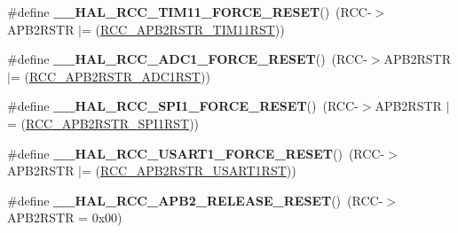 \begin{DoxyCompactItemize}
\item 
\hypertarget{group___r_c_c___a_p_b2___force___release___reset_gaeaf6b459cfeb85e2e098b78825e476f2}{\#define {\bfseries \-\_\-\-\_\-\-H\-A\-L\-\_\-\-R\-C\-C\-\_\-\-T\-I\-M11\-\_\-\-F\-O\-R\-C\-E\-\_\-\-R\-E\-S\-E\-T}()~(R\-C\-C-\/$>$A\-P\-B2\-R\-S\-T\-R $\vert$= (\hyperlink{group___peripheral___registers___bits___definition_ga9651c8201d42ba03bb1bf89d9d39e60c}{R\-C\-C\-\_\-\-A\-P\-B2\-R\-S\-T\-R\-\_\-\-T\-I\-M11\-R\-S\-T}))}\label{group___r_c_c___a_p_b2___force___release___reset_gaeaf6b459cfeb85e2e098b78825e476f2}

\item 
\hypertarget{group___r_c_c___a_p_b2___force___release___reset_ga6176fa4f52de6ebf932d99a4d611634d}{\#define {\bfseries \-\_\-\-\_\-\-H\-A\-L\-\_\-\-R\-C\-C\-\_\-\-A\-D\-C1\-\_\-\-F\-O\-R\-C\-E\-\_\-\-R\-E\-S\-E\-T}()~(R\-C\-C-\/$>$A\-P\-B2\-R\-S\-T\-R $\vert$= (\hyperlink{group___peripheral___registers___bits___definition_ga7b818d0d9747621c936ad16c93a4956a}{R\-C\-C\-\_\-\-A\-P\-B2\-R\-S\-T\-R\-\_\-\-A\-D\-C1\-R\-S\-T}))}\label{group___r_c_c___a_p_b2___force___release___reset_ga6176fa4f52de6ebf932d99a4d611634d}

\item 
\hypertarget{group___r_c_c___a_p_b2___force___release___reset_ga87e6bc588fa1d5ce3928d2fd2a3156a4}{\#define {\bfseries \-\_\-\-\_\-\-H\-A\-L\-\_\-\-R\-C\-C\-\_\-\-S\-P\-I1\-\_\-\-F\-O\-R\-C\-E\-\_\-\-R\-E\-S\-E\-T}()~(R\-C\-C-\/$>$A\-P\-B2\-R\-S\-T\-R $\vert$= (\hyperlink{group___peripheral___registers___bits___definition_ga345f05d3508a9fd5128208761feb29fb}{R\-C\-C\-\_\-\-A\-P\-B2\-R\-S\-T\-R\-\_\-\-S\-P\-I1\-R\-S\-T}))}\label{group___r_c_c___a_p_b2___force___release___reset_ga87e6bc588fa1d5ce3928d2fd2a3156a4}

\item 
\hypertarget{group___r_c_c___a_p_b2___force___release___reset_ga5db01cf30bf3c5c7fc0b42220f4c70ad}{\#define {\bfseries \-\_\-\-\_\-\-H\-A\-L\-\_\-\-R\-C\-C\-\_\-\-U\-S\-A\-R\-T1\-\_\-\-F\-O\-R\-C\-E\-\_\-\-R\-E\-S\-E\-T}()~(R\-C\-C-\/$>$A\-P\-B2\-R\-S\-T\-R $\vert$= (\hyperlink{group___peripheral___registers___bits___definition_gae7ae8e338b3b42ad037e9e5b6eeb2c41}{R\-C\-C\-\_\-\-A\-P\-B2\-R\-S\-T\-R\-\_\-\-U\-S\-A\-R\-T1\-R\-S\-T}))}\label{group___r_c_c___a_p_b2___force___release___reset_ga5db01cf30bf3c5c7fc0b42220f4c70ad}

\item 
\hypertarget{group___r_c_c___a_p_b2___force___release___reset_gae1e413d623154942d5bbe89769161ece}{\#define {\bfseries \-\_\-\-\_\-\-H\-A\-L\-\_\-\-R\-C\-C\-\_\-\-A\-P\-B2\-\_\-\-R\-E\-L\-E\-A\-S\-E\-\_\-\-R\-E\-S\-E\-T}()~(R\-C\-C-\/$>$A\-P\-B2\-R\-S\-T\-R = 0x00)}\label{group___r_c_c___a_p_b2___force___release___reset_gae1e413d623154942d5bbe89769161ece}


\end{DoxyCompactItemize}
